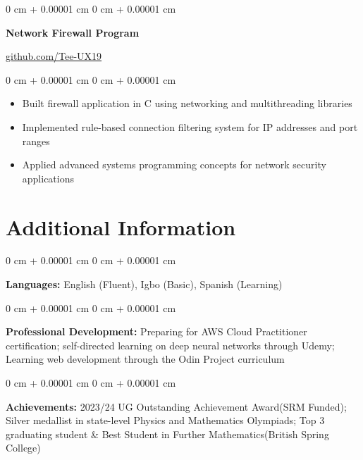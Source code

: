 \documentclass[10pt, a4paper]{article}
\newenvironment{highlights}{
    \begin{itemize}[
        topsep=0.10 cm,
        parsep=0.10 cm,
        partopsep=0pt,
        itemsep=0pt,
        leftmargin=20pt
    ]
}{
    \end{itemize}
} %
\newenvironment{onecolentry}{
    \begin{adjustwidth}{
        0 cm + 0.00001 cm
    }{
        0 cm + 0.00001 cm
    }
}{
    \end{adjustwidth}
} %
\newenvironment{twocolentry}[2][]{
    \onecolentry
    \def\secondColumn{#2}
    \setcolumnwidth{\fill, 4.5 cm}
    \begin{paracol}{2}
}{
    \switchcolumn \raggedleft \secondColumn
    \end{paracol}
    \endonecolentry
} %
\begin{document}
    \vspace{0.2 cm}

    \begin{twocolentry}{
        \href{https://github.com/Tee-UX19}{github.com/Tee-UX19}
    }
        \textbf{Network Firewall Program}
    \end{twocolentry}

    \vspace{0.10 cm}
    \begin{onecolentry}
        \begin{highlights}
            \item Built firewall application in C using networking and multithreading libraries
            \item Implemented rule-based connection filtering system for IP addresses and port ranges
            \item Applied advanced systems programming concepts for network security applications
        \end{highlights}
    \end{onecolentry}

    \section{Additional Information}

    \begin{onecolentry}
        \textbf{Languages:} English (Fluent), Igbo (Basic), Spanish (Learning)
    \end{onecolentry}

    \vspace{0.15 cm}

    \begin{onecolentry}
        \textbf{Professional Development:} Preparing for AWS Cloud Practitioner certification; self-directed learning on deep neural networks through Udemy; Learning web development through the Odin Project curriculum
    \end{onecolentry}

    \vspace{0.15 cm}

    \begin{onecolentry}
        \textbf{Achievements:} 2023/24 UG Outstanding Achievement Award(SRM Funded); Silver medallist in state-level Physics and Mathematics Olympiads; Top 3 graduating student \& Best Student in Further Mathematics(British Spring College)
    \end{onecolentry}

\end{document}
